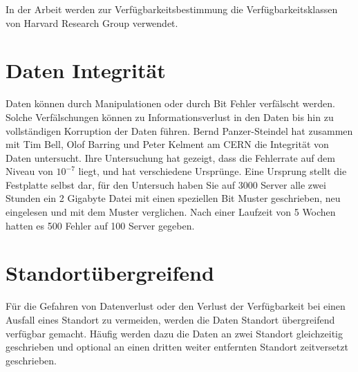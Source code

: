 In der Arbeit werden zur Verfügbarkeitsbestimmung die Verfügbarkeitsklassen von Harvard Research Group verwendet.

\section{Daten Integrität}
Daten können durch Manipulationen oder durch Bit Fehler verfälscht werden. Solche Verfälschungen können zu Informationsverlust in den Daten bis hin zu vollständigen Korruption der Daten führen. 
Bernd Panzer-Steindel hat zusammen mit Tim Bell, Olof Barring und Peter Kelment am CERN die Integrität von Daten untersucht. Ihre Untersuchung hat gezeigt, dass die Fehlerrate auf dem Niveau von $10^{-7}$ liegt, und hat verschiedene Ursprünge. Eine Ursprung stellt die Festplatte selbst dar, für den Untersuch haben Sie auf 3000 Server alle zwei Stunden ein 2 Gigabyte Datei mit einen speziellen Bit Muster geschrieben, neu eingelesen und mit dem Muster verglichen. Nach einer Laufzeit von 5 Wochen hatten es 500 Fehler auf 100 Server gegeben.\cite{Panzer-steindel2007}

\section{Standortübergreifend}
Für die Gefahren von Datenverlust oder den Verlust der Verfügbarkeit bei einen Ausfall eines Standort zu vermeiden, werden die Daten Standort übergreifend verfügbar gemacht. Häufig werden dazu die Daten an zwei Standort gleichzeitig geschrieben und optional an einen dritten weiter entfernten Standort zeitversetzt geschrieben. 